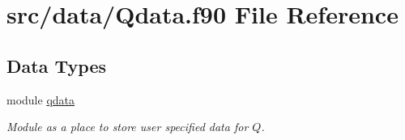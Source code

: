 \hypertarget{_qdata_8f90}{\section{src/data/\-Qdata.f90 File Reference}
\label{_qdata_8f90}
}
\subsection*{Data Types}
\begin{DoxyCompactItemize}
\item 
module \hyperlink{classqdata}{qdata}
\begin{DoxyCompactList}\small\item\em Module as a place to store user specified data for $Q$. \end{DoxyCompactList}\end{DoxyCompactItemize}
